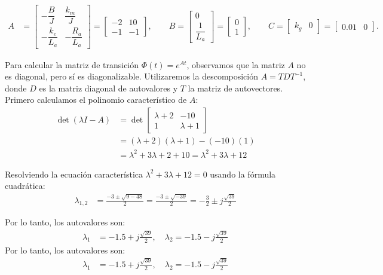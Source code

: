 \documentclass[
  11pt,
  letterpaper,
   addpoints,
   answers
  ]{exam}
\begin{document}
\begin{solution}
\begin{align}
A&=
\begin{bmatrix}
-\dfrac{B}{J} & \dfrac{k_m}{J}\\[4pt]
-\dfrac{k_e}{L_a} & -\dfrac{R_a}{L_a}
\end{bmatrix}
=
\begin{bmatrix}
-2 & 10\\
-1 & -1
\end{bmatrix},\qquad
B=
\begin{bmatrix}
0\\[2pt] \dfrac{1}{L_a}
\end{bmatrix}
=
\begin{bmatrix}
0\\ 1
\end{bmatrix},\qquad
C=\begin{bmatrix} k_g & 0\end{bmatrix}=\begin{bmatrix}0.01 & 0\end{bmatrix}.
\end{align}

Para calcular la matriz de transición $\Phi(t) = e^{At}$, observamos que la matriz $A$ no es diagonal, pero sí es diagonalizable. Utilizaremos la descomposición $A=TDT^{-1}$, donde $D$ es la matriz diagonal de autovalores y $T$ la matriz de autovectores. Primero calculamos el polinomio característico de $A$:
\begin{align}
\det(\lambda I-A) &= \det\begin{bmatrix} \lambda+2 & -10 \\ 1 & \lambda+1 \end{bmatrix} \\
&= (\lambda+2)(\lambda+1) - (-10)(1) \\
&= \lambda^2 + 3\lambda + 2 + 10 = \lambda^2+3\lambda+12
\end{align}

Resolviendo la ecuación característica $\lambda^2+3\lambda+12=0$ usando la fórmula cuadrática:
\begin{align}
\lambda_{1,2} &= \frac{-3 \pm \sqrt{9-48}}{2} = \frac{-3 \pm \sqrt{-39}}{2} = -\frac{3}{2} \pm j\frac{\sqrt{39}}{2}
\end{align}

Por lo tanto, los autovalores son:
\begin{align}
  \lambda_1 &= -1.5 + j\frac{\sqrt{39}}{2}, \quad \lambda_2 = -1.5 - j\frac{\sqrt{39}}{2}
\end{align}
Por lo tanto, los autovalores son:
\begin{align}
  \lambda_1 &= -1.5 + j\frac{\sqrt{39}}{2}, \quad \lambda_2 = -1.5 - j\frac{\sqrt{39}}{2}
\end{align}


\end{solution}
\end{document}
